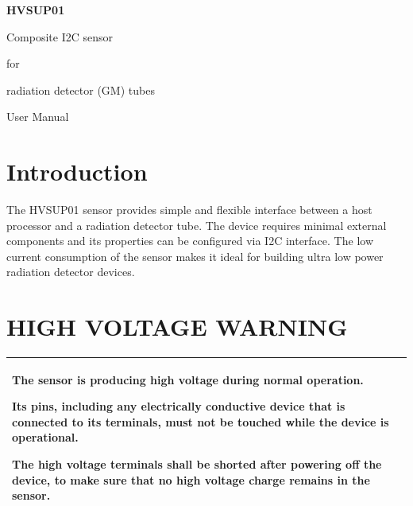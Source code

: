 \documentclass[a4paper]{article}
\title{}
\author{}
\date{2020-10-24}
\begin{document}
\bigskip

{\centering{}\sffamily\bfseries
HVSUP01
\par}

{\centering{}\sffamily
Composite I2C sensor 
\par}

{\centering{}\sffamily
for 
\par}

{\centering{}\sffamily
radiation detector (GM) tubes
\par}


\bigskip


\bigskip


\bigskip

{\centering{}\sffamily
User Manual
\par}

\setcounter{tocdepth}{10}
\renewcommand\contentsname{Table of Contents}
\tableofcontents
\section[]{ }
\clearpage\section[Introduction]{ Introduction}
\hypertarget{RefHeadingToc1311383566216}{}{
The HVSUP01 sensor provides simple and flexible interface between a host processor and a radiation detector tube. The
device requires minimal external components and its properties can be configured via I2C interface. The low current
consumption of the sensor makes it ideal for building ultra low power radiation detector devices.}

\section[HIGH VOLTAGE WARNING]{ HIGH VOLTAGE WARNING}
\hypertarget{RefHeadingToc3481383566216}{}\begin{center}
\tablefirsthead{}
\tablehead{}
\tabletail{}
\tablelasttail{}
\begin{supertabular}{|m{6.6163597in}|}
\hline
{\color[rgb]{0.8,0.0,0.0} The sensor is producing high voltage during normal operation. }

{\color[rgb]{0.8,0.0,0.0} Its pins, including any electrically conductive device that is
connected to its terminals, must not be touched while the device is operational. }

{\color[rgb]{0.8,0.0,0.0} The high voltage terminals shall be shorted after powering off the
device, to make sure that no high voltage charge remains in the sensor.}\\\hline
\end{supertabular}
\end{center}
\end{document}
